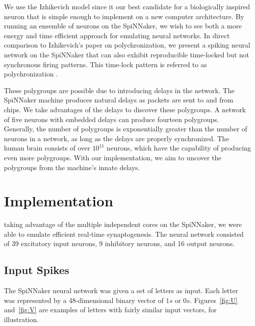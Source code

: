 \documentclass[journal]{./sty/IEEEtran}
\begin{document}
We use the Izhikevich model since it our best candidate for a biologically inspired neuron
that is simple enough to implement on a new computer architecture. 
By running an ensemble of neurons on the SpiNNaker, 
we wish to see both a more energy and time efficient approach for emulating neural networks.
In direct comparison to Izhikevich's paper on polychronization, 
we present a spiking neural network on the SpiNNaker 
that can also exhibit reproducible time-locked but not synchronous firing patterns.
This time-lock pattern is referred to as polychronization \cite{Polychron:Izhi}.

These polygroups are possible due to introducing delays in the network.
The SpiNNaker machine produces natural delays as packets are sent to and from chips.
We take advantages of the delays to discover these polygroups.
A network of five neurons with embedded delays can produce fourteen polygroups.
Generally, the number of polygroups is exponentially greater than the number of neurons in a network, 
as long as the delays are properly synchronized. 
The human brain consists of over $10^{11}$ neurons, which have the capability of producing even more polygroups.
With our implementation, we aim to uncover the polygroups from the machine's innate delays.

\section{Implementation}
 taking advantage of the multiple independent cores on the SpiNNaker, we were able to emulate efficient real-time synaptogenesis. The neural network consisted of 39 excitatory input neurons, 9 inhibitory neurons, and 16 output neurons. 

\subsection{Input Spikes}
The SpiNNaker neural network was given a set of letters as input. 
Each letter was represented by a 48-dimensional binary vector of $1s$ or $0s$. Figures~\ref{fig:U} and~\ref{fig:V} are examples of letters with fairly similar input vectors, for illustration.
\end{document}

